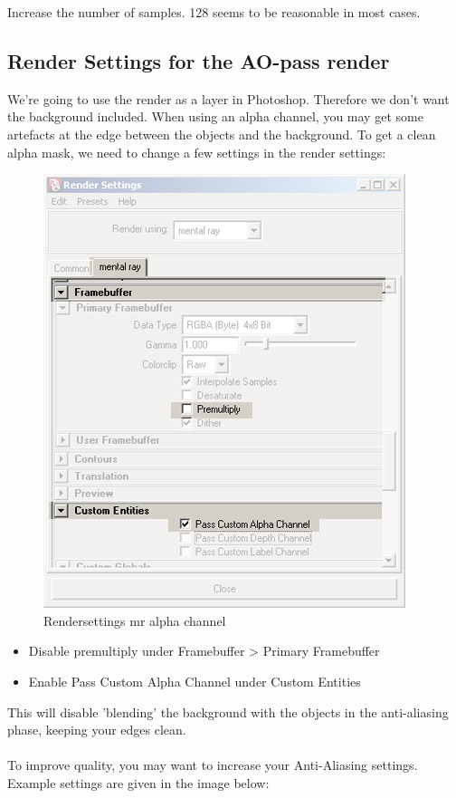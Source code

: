\documentclass[10pt,a4paper]{article}
\begin{document}
Increase the number of samples. 128 seems to be reasonable in most cases.

\subsection{Render Settings for the AO-pass render}
We're going to use the render as a layer in Photoshop. Therefore we don't want the background included. When using an alpha channel, you may get some artefacts at the edge between the objects and the background. To get a clean alpha mask, we need to change a few settings in the render settings:

\begin{figure}[tbh]
\centering
\includegraphics[width=0.5\linewidth]{figure/Rendersettings_mr_alpha_channel}
\caption{Rendersettings mr alpha channel}
\label{fig:rendersettingsmralphachannel}
\end{figure}

\begin{itemize}
	\item Disable premultiply under Framebuffer > Primary Framebuffer
	\item Enable Pass Custom Alpha Channel under Custom Entities
\end{itemize}

This will disable 'blending' the background with the objects in the anti-aliasing phase, keeping your edges clean.
\\
\\
To improve quality, you may want to increase your Anti-Aliasing settings. Example settings are given in the image below:
\end{document}
